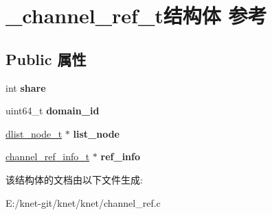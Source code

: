 \hypertarget{struct__channel__ref__t}{}\section{\+\_\+channel\+\_\+ref\+\_\+t结构体 参考}
\label{struct__channel__ref__t}
\subsection*{Public 属性}
\begin{DoxyCompactItemize}
\item 
\hypertarget{struct__channel__ref__t_a6fbc267d43e4e1b98e5dbbbd25fc77f5}{}int {\bfseries share}\label{struct__channel__ref__t_a6fbc267d43e4e1b98e5dbbbd25fc77f5}

\item 
\hypertarget{struct__channel__ref__t_a2d8872b940a96f84e2f704ac3d4a1197}{}uint64\+\_\+t {\bfseries domain\+\_\+id}\label{struct__channel__ref__t_a2d8872b940a96f84e2f704ac3d4a1197}

\item 
\hypertarget{struct__channel__ref__t_a4b6d9691edcd176f6048b381b0936e45}{}\hyperlink{struct__dlist__node__t}{dlist\+\_\+node\+\_\+t} $\ast$ {\bfseries list\+\_\+node}\label{struct__channel__ref__t_a4b6d9691edcd176f6048b381b0936e45}

\item 
\hypertarget{struct__channel__ref__t_ab5214b13df76bc824cd4c590976fe804}{}\hyperlink{struct__channel__ref__info__t}{channel\+\_\+ref\+\_\+info\+\_\+t} $\ast$ {\bfseries ref\+\_\+info}\label{struct__channel__ref__t_ab5214b13df76bc824cd4c590976fe804}

\end{DoxyCompactItemize}


该结构体的文档由以下文件生成\+:\begin{DoxyCompactItemize}
\item 
E\+:/knet-\/git/knet/knet/channel\+\_\+ref.\+c\end{DoxyCompactItemize}
